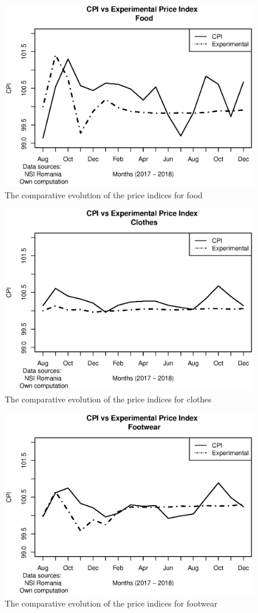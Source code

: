 \documentclass[]{article}
\begin{document}
\clearpage

\begin{figure}
	\centering
	\includegraphics[width=0.7\linewidth]{fig3.eps}
	\caption{The comparative evolution of the price indices for food}
	\label{fig:4}
\end{figure}

\clearpage

\begin{figure}
	\centering
	\includegraphics[width=0.7\linewidth]{fig4.eps}
	\caption{The comparative evolution of the price indices for clothes}
	\label{fig:5}
\end{figure}

\clearpage

\begin{figure}
	\centering
	\includegraphics[width=0.7\linewidth]{fig5.eps}
	\caption{The comparative evolution of the price indices for footwear}
	\label{fig:6}
\end{figure}
\end{document}
